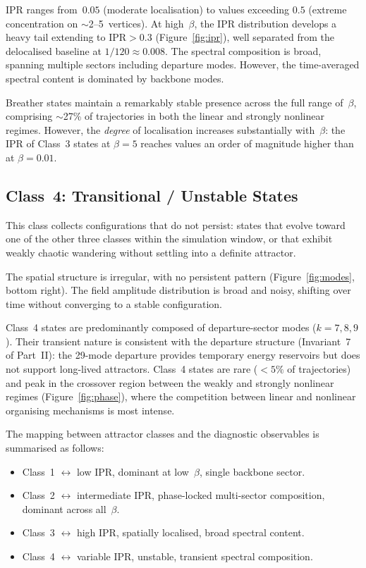 \documentclass[12pt,a4paper]{article}
\begin{document}
IPR ranges from~$0.05$ (moderate localisation) to values exceeding
$0.5$ (extreme concentration on $\sim$2--5~vertices).  At high~$\beta$,
the IPR distribution develops a heavy tail extending to $\mathrm{IPR}
> 0.3$ (Figure~\ref{fig:ipr}), well separated from the delocalised
baseline at $1/120 \approx 0.008$.  The spectral composition is
broad, spanning multiple sectors including departure modes.  However,
the time-averaged spectral content is dominated by backbone modes.

Breather states maintain a remarkably stable presence across the full
range of~$\beta$, comprising $\sim$27\% of trajectories in both the
linear and strongly nonlinear regimes.  However, the \emph{degree} of
localisation increases substantially with~$\beta$: the IPR of Class~3
states at $\beta = 5$ reaches values an order of magnitude higher than
at $\beta = 0.01$.

\subsection{Class~4: Transitional / Unstable States}

This class collects configurations that do not persist: states that
evolve toward one of the other three classes within the simulation
window, or that exhibit weakly chaotic wandering without settling into
a definite attractor.

The spatial structure is irregular, with no persistent pattern
(Figure~\ref{fig:modes}, bottom right).  The field amplitude
distribution is broad and noisy, shifting over time without converging
to a stable configuration.

Class~4 states are predominantly composed of departure-sector modes
($k = 7, 8, 9$).  Their transient nature is consistent with the
departure structure (Invariant~7 of Part~II): the 29-mode departure
provides temporary energy reservoirs but does not support long-lived
attractors.  Class~4 states are rare ($< 5\%$ of trajectories) and
peak in the crossover region between the weakly and strongly nonlinear
regimes (Figure~\ref{fig:phase}), where the competition between
linear and nonlinear organising mechanisms is most intense.

\medskip

The mapping between attractor classes and the diagnostic observables
is summarised as follows:
\begin{itemize}[nosep]
\item Class~1 $\leftrightarrow$ low IPR, dominant at low~$\beta$,
  single backbone sector.
\item Class~2 $\leftrightarrow$ intermediate IPR, phase-locked
  multi-sector composition, dominant across all~$\beta$.
\item Class~3 $\leftrightarrow$ high IPR, spatially localised,
  broad spectral content.
\item Class~4 $\leftrightarrow$ variable IPR, unstable, transient
  spectral composition.
\end{itemize}
\end{document}
